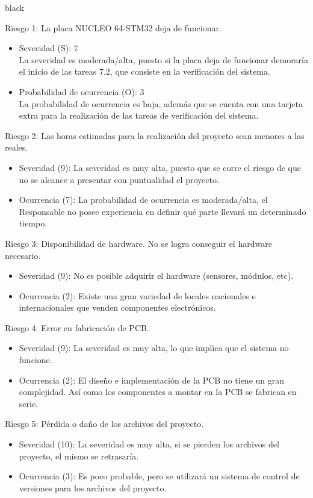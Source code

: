 \documentclass[11pt]{charter}
\begin{document}
\begin{consigna}{black}
 
Riesgo 1: La placa NUCLEO 64-STM32 deja de funcionar.
\begin{itemize}
\item Severidad (S): 7\\
La severidad es moderada/alta, puesto si la placa deja de funcionar demoraría el inicio de las tareas 7.2, que consiste en la verificación del sistema.
\item Probabilidad de ocurrencia (O): 3\\
La probabilidad de ocurrencia es baja, además que se cuenta con una tarjeta extra para la realización de las tareas de verificación del sistema. 
\end{itemize}   

Riesgo 2: Las horas estimadas para la realización del proyecto sean menores a las reales.
\begin{itemize}
\item Severidad (9): La severidad es muy alta, puesto que se corre el riesgo de que no se alcance a presentar con puntualidad el proyecto. 
\item Ocurrencia (7): La probabilidad de ocurrencia es moderada/alta, el Responsable no posee experiencia en definir qué parte llevará un determinado tiempo. 
\end{itemize}

Riesgo 3: Disponibilidad de hardware. No se logra conseguir el hardware necesario.
\begin{itemize}
\item Severidad (9): No es posible adquirir el hardware (sensores, módulos, etc).
\item Ocurrencia (2): Existe una gran variedad de locales nacionales e internacionales que venden componentes electrónicos.
\end{itemize}

Riesgo 4: Error en fabricación de PCB. 
\begin{itemize}
\item Severidad (9): La severidad es muy alta, lo que implica que el sistema no funcione.
\item Ocurrencia (2): El diseño e implementación de la PCB no tiene un gran complejidad. Así como los componentes a montar en la PCB se fabrican en serie.
\end{itemize}

Riesgo 5: Pérdida o daño de los archivos del proyecto.
\begin{itemize}
\item Severidad (10): La severidad es muy alta, si se pierden los archivos del proyecto, el mismo se retrasaría.
\item Ocurrencia (3): Es poco probable, pero se utilizará un sistema de control de versiones para los archivos del proyecto.
\end{itemize}


\end{consigna}
\end{document}
